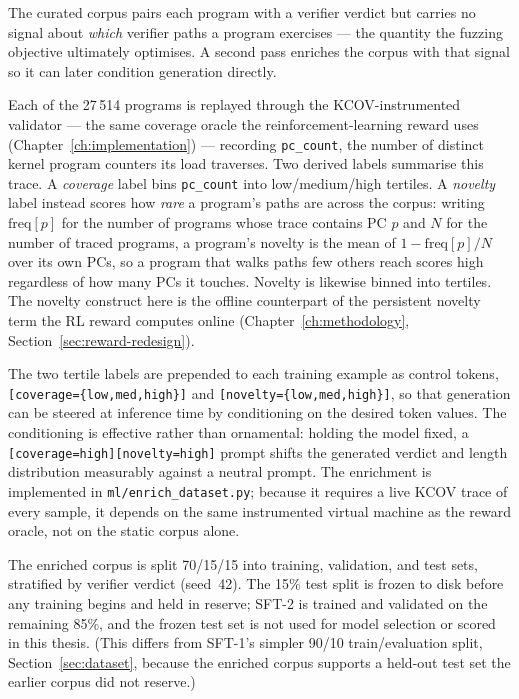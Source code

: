 The curated corpus pairs each program with a verifier verdict but carries no signal
about \emph{which} verifier paths a program exercises --- the quantity the fuzzing
objective ultimately optimises. A second pass enriches the corpus with that signal so
it can later condition generation directly.

Each of the 27\,514 programs is replayed through the KCOV-instrumented validator ---
the same coverage oracle the reinforcement-learning reward uses
(Chapter~\ref{ch:implementation}) --- recording \texttt{pc\_count}, the number of
distinct kernel program counters its load traverses. Two derived labels summarise this
trace. A \emph{coverage} label bins \texttt{pc\_count} into low/medium/high tertiles. A
\emph{novelty} label instead scores how \emph{rare} a program's paths are across the
corpus: writing $\mathrm{freq}[p]$ for the number of programs whose trace contains PC
$p$ and $N$ for the number of traced programs, a program's novelty is the mean of
$1-\mathrm{freq}[p]/N$ over its own PCs, so a program that walks paths few others reach
scores high regardless of how many PCs it touches. Novelty is likewise binned into
tertiles. The novelty construct here is the offline counterpart of the persistent
novelty term the RL reward computes online (Chapter~\ref{ch:methodology},
Section~\ref{sec:reward-redesign}).

The two tertile labels are prepended to each training example as control tokens,
\texttt{[coverage=\{low,med,high\}]} and \texttt{[novelty=\{low,med,high\}]}, so that
generation can be steered at inference time by conditioning on the desired token
values. The conditioning is effective rather than ornamental: holding the model fixed,
a \texttt{[coverage=high][novelty=high]} prompt shifts the generated verdict and
length distribution measurably against a neutral prompt. The enrichment is implemented
in \texttt{ml/enrich\_dataset.py}; because it requires a live KCOV trace of every
sample, it depends on the same instrumented virtual machine as the reward oracle, not
on the static corpus alone.

The enriched corpus is split 70/15/15 into training, validation, and test sets,
stratified by verifier verdict (seed~42). The 15\% test split is frozen to disk
before any training begins and held in reserve; SFT-2 is trained and validated on the
remaining 85\%, and the frozen test set is not used for model selection or scored in
this thesis. (This differs from SFT-1's simpler 90/10 train/evaluation split,
Section~\ref{sec:dataset}, because the enriched corpus supports a held-out test set
the earlier corpus did not reserve.)

